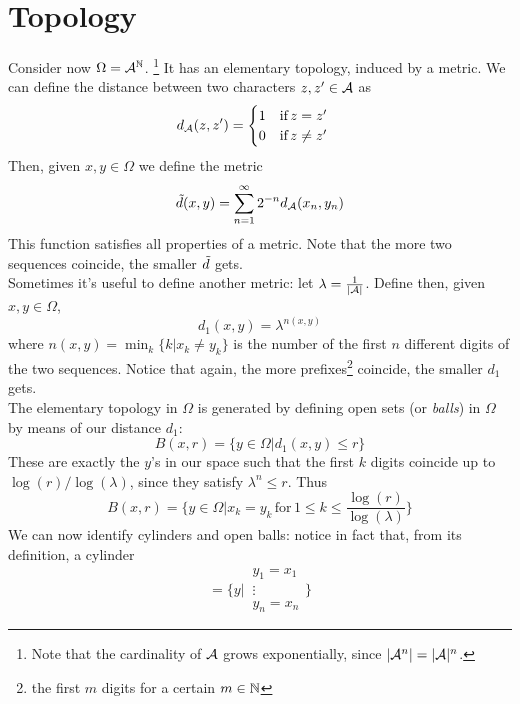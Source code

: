 \section{Topology}
Consider now $\Omega = \mathcal{A}^{\mathbb{N}}$. \footnote{Note that the cardinality of $\mathcal{A}$ grows exponentially, since $|\mathcal{A}^n| = |\mathcal{A}|^n$.} It has an elementary topology, induced by a metric. We can define the distance between two characters $z, z' \in \mathcal{A}$ as 
\begin{equation}
    d_{\mathcal{A}}(z,z') = 
    \begin{cases}
        1 \quad \text{if} \, z = z' \\
        0 \quad \text{if} \, z \neq z'
    \end{cases}
\end{equation}
Then, given $x,y \in \Omega$ we define the metric
\begin{equation}
    \Tilde{d}(x,y) = \sum_{n=1}^{\infty} 2^{-n} d_{\mathcal{A}}(x_n, y_n)  
\end{equation}
This function satisfies all properties of a metric. Note that the more two sequences coincide, the smaller $\Tilde{d}$ gets. \\Sometimes it's useful to define another metric: let $\lambda = \frac{1}{|\mathcal{A}|}$. Define then, given $x,y \in \Omega$,
\begin{equation}
    d_1(x,y) = \lambda^{n(x,y)}
\end{equation}
where $n(x,y) = \min_k \{ k \big| x_k \neq y_k \}$ is the number of the first $n$ different digits of the two sequences. Notice that again, the more prefixes\footnote{the first $m$ digits for a certain $m \in \mathbb{N}$} coincide, the smaller $d_1$ gets. 
\\The elementary topology in $\Omega$ is generated by defining open sets (or \textit{balls}) in $\Omega$ by means of our distance $d_1$:
\begin{equation*}
    B(x,r) = \big\{ y \in \Omega \big| d_1(x,y) \leq r \big\}
\end{equation*}
These are exactly the $y$'s in our space such that the first $k$ digits coincide up to $\log(r) / \log(\lambda)$, since they satisfy $\lambda^n \leq r$. Thus
\begin{equation}
\label{eq:balls}
    B(x,r) = \big\{ y \in \Omega \big| x_k = y_k \, \text{for} \, 1 \leq k \leq \frac{\log(r)}{\log(\lambda)}\big\}
\end{equation}
We can now identify cylinders and open balls: notice in fact that, from its definition, a cylinder 
\begin{equation*}
    [x_1^n] = \bigg\{ y \big| \, 
    \begin{matrix}
        y_1 = x_1 \\
        \vdots \\
        y_n = x_n
    \end{matrix}
    \bigg\}    
\end{equation*}
